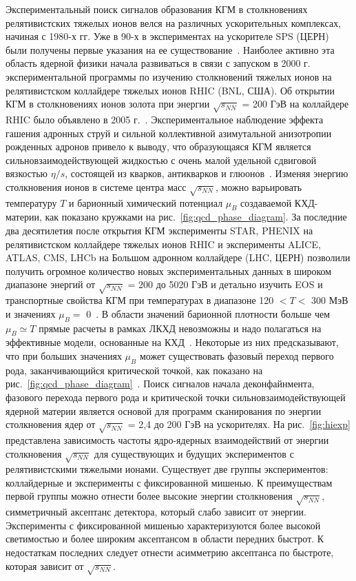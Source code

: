 Экспериментальный поиск сигналов образования КГМ в столкновениях релятивистских тяжелых ионов велся на различных ускорительных комплексах, начиная с 1980-х гг. 
Уже в 90-х в экспериментах на ускорителе SPS (ЦЕРН)  были получены первые указания на ее существование~\cite{NA50:1997hlx}.
Наиболее активно эта область ядерной физики начала развиваться в связи с запуском в 2000 г. экспериментальной программы по изучению столкновений тяжелых ионов на релятивистском коллайдере тяжелых ионов RHIC (BNL, США).
Об открытии КГМ в столкновениях ионов золота при энергии $\sqrt{s_{NN}}$ = 200 ГэВ  на коллайдере RHIC было объявлено в 2005 г.~\cite{STAR:2005gfr}.
Экспериментальное наблюдение эффекта гашения адронных струй и сильной коллективной азимутальной анизотропии рожденных адронов привело  к выводу, что образующаяся КГМ является сильновзаимодействующей жидкостью с очень малой удельной сдвиговой  вязкостью $\eta/s$, состоящей из кварков, антикварков  и глюонов~\cite{Shen:2015msa}.
Изменяя энергию столкновения ионов в системе центра масс $\sqrt{s_{NN}}$, можно варьировать  температуру $T$ и барионный химический потенциал $\mu_B$ создаваемой КХД-материи, как показано кружками на  рис.~\ref{fig:qcd_phase_diagram}.
За последние два десятилетия после открытия КГМ  эксперименты STAR, PHENIX на релятивистском коллайдере тяжелых ионов RHIC и эксперименты ALICE, ATLAS, CMS, LHCb на Большом адронном коллайдере (LHC, ЦЕРН) позволили получить  огромное количество новых экспериментальных  данных в широком диапазоне энергий от $\sqrt{s_{NN}}$ = 200 до 5020 ГэВ и детально изучить EOS и транспортные свойства КГМ при температурах в диапазоне 120 $< T <$ 300 МэВ и значениях $\mu_B =$ 0~\cite{STAR:2017ckg, ALICE:2010suc, ALICE:2011dyt, STAR:2009fks, STAR:2017kkh}.
В области значений барионной плотности больше чем  $\mu_B \simeq T$ прямые расчеты в рамках  ЛКХД невозможны и надо полагаться на эффективные модели, основанные на КХД~\cite{Stoecker:1986ci,Hung:1994eq,Werner:2010aa, Molnar:2004yh,Xu:2004mz}. 
Некоторые из них предсказывают, что при больших значениях $\mu_B$ может существовать фазовый переход первого рода, заканчивающийся критической точкой, как показано на рис.~\ref{fig:qcd_phase_diagram}~\cite{Ding:2015ona}. 
Поиск сигналов начала деконфайнмента, фазового перехода первого рода и критической точки сильновзаимодействующей ядерной материи является основой для программ сканирования по энергии столкновения ядер от $\sqrt{s_{NN}}$ = 2,4 до 200 ГэВ на ускорителях.
На рис.~\ref{fig:hiexp}  представлена зависимость частоты ядро-ядерных взаимодействий от энергии столкновения $\sqrt{s_{NN}}$ для существующих и будущих экспериментов с релятивистскими тяжелыми ионами.  
Существует две группы экспериментов: коллайдерные и эксперименты с фиксированной мишенью. 
К преимуществам первой группы можно отнести более высокие энергии столкновения  $\sqrt{s_{NN}}$, симметричный аксептанс детектора, который слабо зависит от энергии.
Эксперименты с фиксированной  мишенью характеризуются более высокой светимостью и более широким аксептансом в области передних быстрот. 
К недостаткам последних следует отнести асимметрию аксептанса по быстроте, которая  зависит от $\sqrt{s_{NN}}$.

